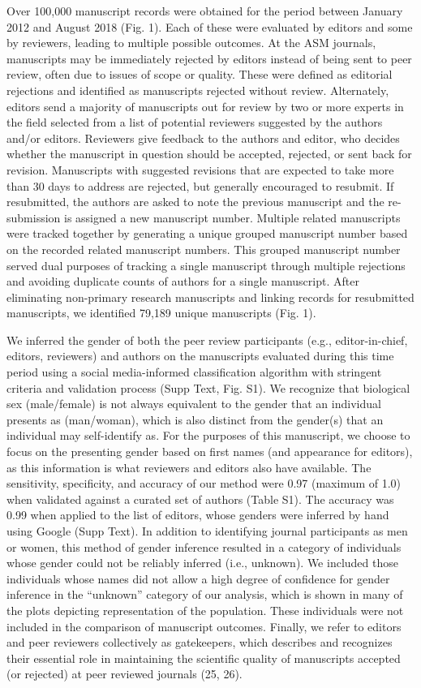 \documentclass[11pt,]{article}
\begin{document}
Over 100,000 manuscript records were obtained for the period between
January 2012 and August 2018 (Fig. 1). Each of these were evaluated by
editors and some by reviewers, leading to multiple possible outcomes. At
the ASM journals, manuscripts may be immediately rejected by editors
instead of being sent to peer review, often due to issues of scope or
quality. These were defined as editorial rejections and identified as
manuscripts rejected without review. Alternately, editors send a
majority of manuscripts out for review by two or more experts in the
field selected from a list of potential reviewers suggested by the
authors and/or editors. Reviewers give feedback to the authors and
editor, who decides whether the manuscript in question should be
accepted, rejected, or sent back for revision. Manuscripts with
suggested revisions that are expected to take more than 30 days to
address are rejected, but generally encouraged to resubmit. If
resubmitted, the authors are asked to note the previous manuscript and
the re-submission is assigned a new manuscript number. Multiple related
manuscripts were tracked together by generating a unique grouped
manuscript number based on the recorded related manuscript numbers. This
grouped manuscript number served dual purposes of tracking a single
manuscript through multiple rejections and avoiding duplicate counts of
authors for a single manuscript. After eliminating non-primary research
manuscripts and linking records for resubmitted manuscripts, we
identified 79,189 unique manuscripts (Fig. 1).

We inferred the gender of both the peer review participants (e.g.,
editor-in-chief, editors, reviewers) and authors on the manuscripts
evaluated during this time period using a social media-informed
classification algorithm with stringent criteria and validation process
(Supp Text, Fig. S1). We recognize that biological sex (male/female) is
not always equivalent to the gender that an individual presents as
(man/woman), which is also distinct from the gender(s) that an
individual may self-identify as. For the purposes of this manuscript, we
choose to focus on the presenting gender based on first names (and
appearance for editors), as this information is what reviewers and
editors also have available. The sensitivity, specificity, and accuracy
of our method were 0.97 (maximum of 1.0) when validated against a
curated set of authors (Table S1). The accuracy was 0.99 when applied to
the list of editors, whose genders were inferred by hand using Google
(Supp Text). In addition to identifying journal participants as men or
women, this method of gender inference resulted in a category of
individuals whose gender could not be reliably inferred (i.e., unknown).
We included those individuals whose names did not allow a high degree of
confidence for gender inference in the ``unknown'' category of our
analysis, which is shown in many of the plots depicting representation
of the population. These individuals were not included in the comparison
of manuscript outcomes. Finally, we refer to editors and peer reviewers
collectively as gatekeepers, which describes and recognizes their
essential role in maintaining the scientific quality of manuscripts
accepted (or rejected) at peer reviewed journals (25, 26).
\end{document}
